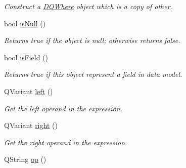 \begin{DoxyCompactItemize}
\begin{DoxyCompactList}\small\item\em Construct a \hyperlink{classDQWhere}{DQWhere} object which is a copy of other. \item\end{DoxyCompactList}\item 
bool \hyperlink{classDQWhere_adcbc3923376fab6c6fb1dea984dacba1}{isNull} ()
\begin{DoxyCompactList}\small\item\em Returns true if the object is null; otherwise returns false. \item\end{DoxyCompactList}\item 
\hypertarget{classDQWhere_a7a641650ab98b1713daf2924a20df0f7}{
bool \hyperlink{classDQWhere_a7a641650ab98b1713daf2924a20df0f7}{isField} ()}
\label{classDQWhere_a7a641650ab98b1713daf2924a20df0f7}

\begin{DoxyCompactList}\small\item\em Returns true if this object represent a field in data model. \item\end{DoxyCompactList}\item 
\hypertarget{classDQWhere_ad6da032a0c2342fe2d90c2a1aab98d72}{
QVariant \hyperlink{classDQWhere_ad6da032a0c2342fe2d90c2a1aab98d72}{left} ()}
\label{classDQWhere_ad6da032a0c2342fe2d90c2a1aab98d72}

\begin{DoxyCompactList}\small\item\em Get the left operand in the expression. \item\end{DoxyCompactList}\item 
\hypertarget{classDQWhere_a206ab7b9e6172f927973e2c82d6be8dd}{
QVariant \hyperlink{classDQWhere_a206ab7b9e6172f927973e2c82d6be8dd}{right} ()}
\label{classDQWhere_a206ab7b9e6172f927973e2c82d6be8dd}

\begin{DoxyCompactList}\small\item\em Get the right operand in the expression. \item\end{DoxyCompactList}\item 
\hypertarget{classDQWhere_ad6119df023ebdc0974adc2afa1ddc898}{
QString \hyperlink{classDQWhere_ad6119df023ebdc0974adc2afa1ddc898}{op} ()}
\label{classDQWhere_ad6119df023ebdc0974adc2afa1ddc898}


\end{DoxyCompactItemize}
